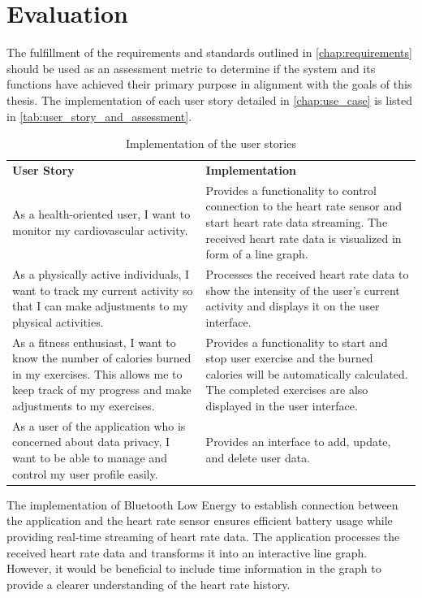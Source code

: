 \section{Evaluation}
The fulfillment of the requirements and standards outlined in \autoref{chap:requirements} should be used as an assessment metric to determine if the system and its functions have achieved their primary purpose in alignment with the goals of this thesis. 
The implementation of each user story detailed in \autoref{chap:use_case} is listed in \autoref{tab:user_story_and_assessment}.
\clearpage
\begin{longtable}{p{} p{}}
    \label{tab:user_story_and_assessment}\\

    \caption{Implementation of the user stories}\\
        \hline
        \textbf{User Story} & \textbf{Implementation} \\
        \hline
        As a health-oriented user, I want to monitor my cardiovascular activity. & Provides a functionality to control connection to the heart rate sensor and start heart rate data streaming. The received heart rate data is visualized in form of a line graph.\\
        \hline
        As a physically active individuals, I want to track my current activity so that I can make adjustments to my physical activities. & Processes the received heart rate data to show the intensity of the user's current activity and displays it on the user interface.\\    
        \hline
        As a fitness enthusiast, I want to know the number of calories burned in my exercises. This allows me to keep track of my progress and make adjustments to my exercises. & Provides a functionality to start and stop user exercise and the burned calories will be automatically calculated. The completed exercises are also displayed in the user interface.\\
        \hline
        As a user of the application who is concerned about data privacy, I want to be able to manage and control my user profile easily. & Provides an interface to add, update, and delete user data.\\
        \hline
\end{longtable}

The implementation of Bluetooth Low Energy to establish connection between the application and the heart rate sensor ensures efficient battery usage while providing real-time streaming of heart rate data. 
The application processes the received heart rate data and transforms it into an interactive line graph. 
However, it would be beneficial to include time information in the graph to provide a clearer understanding of the heart rate history.


